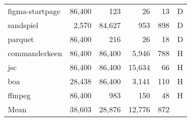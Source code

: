 \begin{tabular}{lrrrrl}
 figma-startpage &    86,400 &       123 &        26 &         13 & D   \\
 sandspiel       &     2,570 &    84,627 &       953 &        898 & D   \\
 parquet         &    86,400 &       216 &        26 &         18 & D   \\
 commanderkeen   &    86,400 &    86,400 &     5,946 &        788 & H   \\
 jsc             &    86,400 &    86,400 &    15,634 &         66 & H   \\
 boa             &    28,438 &    86,400 &     3,141 &        110 & H   \\
 ffmpeg          &    86,400 &       983 &       150 &         48 & H   \\
 Mean            &    38,603 &    28,876 &    12,776 &        872 &     \\
\hline
\end{tabular}